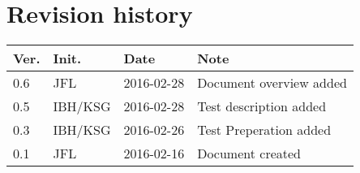 \chapter*{Revision history}
\label{app:rev_his}


\begin{tabular}{b{1cm} b{1.5cm} b{2cm} b{8cm}}
    \textbf{Ver.} & \textbf{Init.} & \textbf{Date} & \textbf{Note} \\
    \hline
    0.6 & JFL & 2016-02-28 & Document overview added\\
    0.5 & IBH/KSG & 2016-02-28 & Test description added \\
    0.3 & IBH/KSG & 2016-02-26 & Test Preperation added \\
    0.1 & JFL & 2016-02-16 & Document created \\
\end{tabular}
